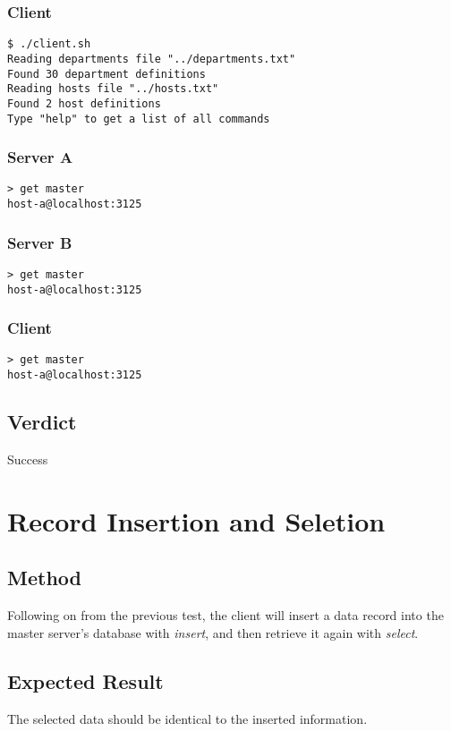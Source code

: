 \documentclass[a4paper,11pt]{article}
\begin{document}
\subsubsection{Client}
\begin{verbatim}
$ ./client.sh
Reading departments file "../departments.txt"
Found 30 department definitions
Reading hosts file "../hosts.txt"
Found 2 host definitions
Type "help" to get a list of all commands
\end{verbatim}

\subsubsection{Server A}
\begin{verbatim}
> get master
host-a@localhost:3125
\end{verbatim}

\subsubsection{Server B}
\begin{verbatim}
> get master
host-a@localhost:3125
\end{verbatim}

\subsubsection{Client}
\begin{verbatim}
> get master
host-a@localhost:3125
\end{verbatim}

\subsection{Verdict}
Success

\section{Record Insertion and Seletion}
\subsection{Method}
Following on from the previous test, the client will insert a data record into the master server's database with \emph{insert}, and then retrieve it again with \emph{select}.

\subsection{Expected Result}
The selected data should be identical to the inserted information.
\end{document}

